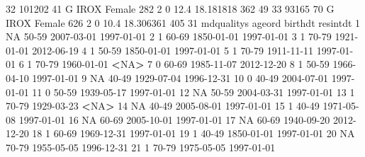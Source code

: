 \documentclass[
]{book}
\newenvironment{Shaded}{\begin{snugshade}}{\end{snugshade}}
\newcommand{\DecValTok}[1]{\textcolor[rgb]{0.00,0.00,0.81}{#1}}
\newcommand{\FloatTok}[1]{\textcolor[rgb]{0.00,0.00,0.81}{#1}}
\newcommand{\NormalTok}[1]{#1}
\newcommand{\OperatorTok}[1]{\textcolor[rgb]{0.81,0.36,0.00}{\textbf{#1}}}
\newcommand{\OtherTok}[1]{\textcolor[rgb]{0.56,0.35,0.01}{#1}}
\begin{document}
\begin{Shaded}
\begin{Highlighting}[]
\DecValTok{32} \DecValTok{101202}  \DecValTok{41}\NormalTok{   G IROX Female    }\DecValTok{282}      \DecValTok{2}  \DecValTok{0} \FloatTok{12.4} \FloatTok{18.181818}     \DecValTok{362}  \DecValTok{49}
\DecValTok{33}  \DecValTok{93165}  \DecValTok{70}\NormalTok{   G IROX Female    }\DecValTok{626}      \DecValTok{2}  \DecValTok{0} \FloatTok{10.4} \FloatTok{18.306361}     \DecValTok{405}  \DecValTok{31}
\NormalTok{   mdqualitys ageord    birthdt   resintdt}
\DecValTok{1}          \OtherTok{NA}  \DecValTok{50-59} \DecValTok{2007-03-01} \DecValTok{1997-01-01}
\DecValTok{2}           \DecValTok{1}  \DecValTok{60-69} \DecValTok{1850-01-01} \DecValTok{1997-01-01}
\DecValTok{3}           \DecValTok{1}  \DecValTok{70-79} \DecValTok{1921-01-01} \DecValTok{2012-06-19}
\DecValTok{4}           \DecValTok{1}  \DecValTok{50-59} \DecValTok{1850-01-01} \DecValTok{1997-01-01}
\DecValTok{5}           \DecValTok{1}  \DecValTok{70-79} \DecValTok{1911-11-11} \DecValTok{1997-01-01}
\DecValTok{6}           \DecValTok{1}  \DecValTok{70-79} \DecValTok{1960-01-01}       \OperatorTok{<}\OtherTok{NA}\OperatorTok{>}
\DecValTok{7}           \DecValTok{0}  \DecValTok{60-69} \DecValTok{1985-11-07} \DecValTok{2012-12-20}
\DecValTok{8}           \DecValTok{1}  \DecValTok{50-59} \DecValTok{1966-04-10} \DecValTok{1997-01-01}
\DecValTok{9}          \OtherTok{NA}  \DecValTok{40-49} \DecValTok{1929-07-04} \DecValTok{1996-12-31}
\DecValTok{10}          \DecValTok{0}  \DecValTok{40-49} \DecValTok{2004-07-01} \DecValTok{1997-01-01}
\DecValTok{11}          \DecValTok{0}  \DecValTok{50-59} \DecValTok{1939-05-17} \DecValTok{1997-01-01}
\DecValTok{12}         \OtherTok{NA}  \DecValTok{50-59} \DecValTok{2004-03-31} \DecValTok{1997-01-01}
\DecValTok{13}          \DecValTok{1}  \DecValTok{70-79} \DecValTok{1929-03-23}       \OperatorTok{<}\OtherTok{NA}\OperatorTok{>}
\DecValTok{14}         \OtherTok{NA}  \DecValTok{40-49} \DecValTok{2005-08-01} \DecValTok{1997-01-01}
\DecValTok{15}          \DecValTok{1}  \DecValTok{40-49} \DecValTok{1971-05-08} \DecValTok{1997-01-01}
\DecValTok{16}         \OtherTok{NA}  \DecValTok{60-69} \DecValTok{2005-10-01} \DecValTok{1997-01-01}
\DecValTok{17}         \OtherTok{NA}  \DecValTok{60-69} \DecValTok{1940-09-20} \DecValTok{2012-12-20}
\DecValTok{18}          \DecValTok{1}  \DecValTok{60-69} \DecValTok{1969-12-31} \DecValTok{1997-01-01}
\DecValTok{19}          \DecValTok{1}  \DecValTok{40-49} \DecValTok{1850-01-01} \DecValTok{1997-01-01}
\DecValTok{20}         \OtherTok{NA}  \DecValTok{70-79} \DecValTok{1955-05-05} \DecValTok{1996-12-31}
\DecValTok{21}          \DecValTok{1}  \DecValTok{70-79} \DecValTok{1975-05-05} \DecValTok{1997-01-01}

\end{Highlighting}
\end{Shaded}
\end{document}
